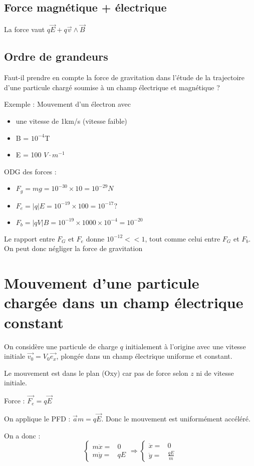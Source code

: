 \documentclass[french]{yLectureNote}
\renewcommand{\vec}{\overrightarrow}
\begin{document}
\subsection{Force magnétique + électrique}
\begin{theorem}
La force vaut $q\vec{E} + q\vec{v}\wedge \vec{B}$
\end{theorem}
\subsection{Ordre de grandeurs}
Faut-il prendre en compte la force de gravitation dans l'étude de la trajectoire d'une particule chargé soumise à un champ électrique et magnétique ?

Exemple : Mouvement d'un électron avec
\begin{itemize}
 \item une vitesse de 1km/s (vitesse faible)
 \item B = $10^{-4}$T
 \item E = 100 $V\cdot m^{-1}$
\end{itemize}

ODG des forces :

\begin{itemize}
 \item $F_g = mg = 10^{-30}\times 10 = 10^{-29}N$
 \item $F_e = |q|E = 10^{-19}\times 100 = 10^{-17}?$
 \item $F_b = |qV|B = 10^{-19} \times 1000 \times 10^{-4} = 10^{-20}$
\end{itemize}

Le rapport entre $F_G$ et $F_e$ donne $10^{-12} << 1$, tout comme celui entre $F_G$ et $F_b$. On peut donc négliger la force de gravitation
\section{Mouvement d'une particule chargée dans un champ électrique constant}
On considère une particule de charge $q$ initialement à l'origine avec une vitesse initiale $\vec{v_0} = V_0\vec{e_x}$, plongée dans un champ électrique uniforme et constant.

Le mouvement est dans le plan (Oxy) car pas de force selon $z$ ni de vitesse initiale.

Force : $\vec{F_e} = q\vec{E}$

On applique le PFD : $\vec{a}m = q\vec{E}$. Donc le mouvement est uniformément accéléré.

On a donc :
\[
 \left\{\begin{matrix}
 m\ddot{x} =& 0 \\
 m\ddot{y} =& qE
\end{matrix}\right.
\Rightarrow
 \left\{\begin{matrix}
 \ddot{x} =& 0\\
 \ddot{y} =& \frac{qE}{m}
\end{matrix}\right.
\]
\end{document}
